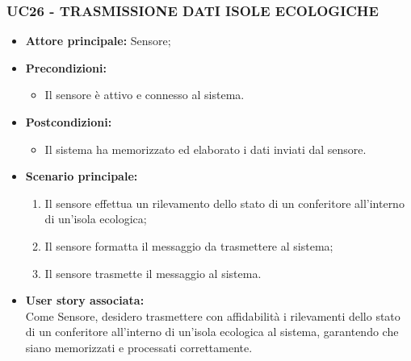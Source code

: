 \subsubsection{UC26 - TRASMISSIONE DATI ISOLE ECOLOGICHE}
\begin{itemize}
    \item \textbf{Attore principale:} Sensore;
    \item \textbf{Precondizioni:}
        \begin{itemize}
            \item Il sensore è attivo e connesso al sistema. 
        \end{itemize}
    \item \textbf{Postcondizioni:}
        \begin{itemize}
            \item Il sistema ha memorizzato ed elaborato i dati inviati dal sensore.
        \end{itemize}
    \item \textbf{Scenario principale:}
        \begin{enumerate}
            \item Il sensore effettua un rilevamento dello stato di un conferitore all'interno di un'isola ecologica;
            \item Il sensore formatta il messaggio da trasmettere al sistema;
            \item Il sensore trasmette il messaggio al sistema.
        \end{enumerate}
    \item \textbf{User story associata:} \\
    Come Sensore, desidero trasmettere con affidabilità i rilevamenti dello stato di un conferitore all'interno di un'isola ecologica al sistema, garantendo che siano memorizzati e processati correttamente.
\end{itemize}
